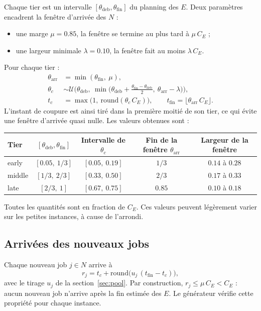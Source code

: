 \documentclass[11pt,a4paper]{article}
\newcommand{\CE}{C_E}
\begin{document}
Chaque tier est un intervalle $[\theta_{\mathrm{deb}}, \theta_{\mathrm{fin}}]$ du planning des $E$.
Deux paramètres encadrent la fenêtre d'arrivée des $N$ :
\begin{itemize}
  \item une marge $\mu = 0.85$, la fenêtre se termine au plus tard à $\mu\,\CE$ ;
  \item une largeur minimale $\lambda = 0.10$, la fenêtre fait au moins $\lambda\,\CE$.
\end{itemize}
Pour chaque tier :
\begin{align*}
  \theta_{\mathrm{arr}} &= \min(\theta_{\mathrm{fin}},\ \mu), \\
  \theta_c &\sim \mathcal{U}\Big(\theta_{\mathrm{deb}},\ \min\big(\theta_{\mathrm{deb}} + \tfrac{\theta_{\mathrm{fin}} - \theta_{\mathrm{deb}}}{2},\ \theta_{\mathrm{arr}} - \lambda\big)\Big), \\
  t_c &= \max\big(1,\ \mathrm{round}(\theta_c\,\CE)\big), \qquad t_{\mathrm{fin}} = \lfloor \theta_{\mathrm{arr}}\,\CE \rfloor.
\end{align*}
L'instant de coupure est ainsi tiré dans la première moitié de son tier, ce qui évite une fenêtre d'arrivée quasi nulle.
Les valeurs obtenues sont :
\begin{center}
\begin{tabular}{lcccc}
\toprule
Tier & $[\theta_{\mathrm{deb}}, \theta_{\mathrm{fin}}]$ & Intervalle de $\theta_c$ & Fin de la fenêtre $\theta_{\mathrm{arr}}$ & Largeur de la fenêtre \\
\midrule
early  & $[0.05,\ 1/3]$ & $[0.05,\ 0.19]$ & $1/3$  & $0.14$ à $0.28$ \\
middle & $[1/3,\ 2/3]$  & $[0.33,\ 0.50]$ & $2/3$  & $0.17$ à $0.33$ \\
late   & $[2/3,\ 1]$    & $[0.67,\ 0.75]$ & $0.85$ & $0.10$ à $0.18$ \\
\bottomrule
\end{tabular}
\end{center}
Toutes les quantités sont en fraction de $\CE$. Ces valeurs peuvent légèrement varier sur les petites instances, à cause de l'arrondi.

\subsection{Arrivées des nouveaux jobs}
\label{sec:arr}

Chaque nouveau job $j \in N$ arrive à
\[
  r_j = t_c + \mathrm{round}\big(u_j\,(t_{\mathrm{fin}} - t_c)\big),
\]
avec le tirage $u_j$ de la section~\ref{sec:pool}.
Par construction, $r_j \le \mu\,\CE < \CE$ : aucun nouveau job n'arrive après la fin estimée des $E$.
Le générateur vérifie cette propriété pour chaque instance.
\end{document}
